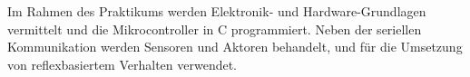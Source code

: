 \begin{module}
\begin{learningoutcomes}
\end{learningoutcomes}

\begin{content}
Im Rahmen des Praktikums werden Elektronik- und Hardware-Grundlagen vermittelt und die Mikrocontroller in C programmiert. Neben der seriellen Kommunikation werden Sensoren und Aktoren behandelt, und für die Umsetzung von reflexbasiertem Verhalten verwendet.


\end{content}



\end{module}

